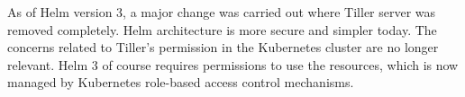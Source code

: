 As of Helm version 3, a major change was carried out where Tiller server was removed completely. Helm architecture is more secure and simpler today. The concerns related to Tiller's permission in the Kubernetes cluster are no longer relevant. Helm 3 of course requires permissions to use the resources, which is now managed by Kubernetes role-based access control mechanisms.
